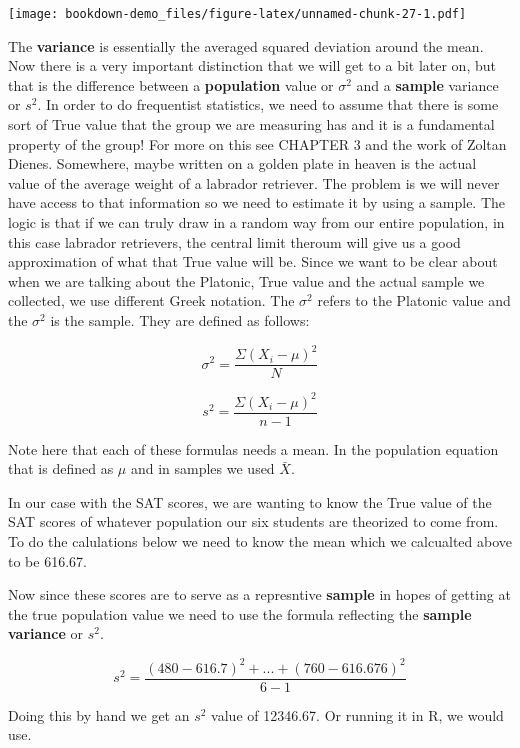 \documentclass[]{book}
\newenvironment{Shaded}{\begin{snugshade}}{\end{snugshade}}
\newcommand{\KeywordTok}[1]{\textcolor[rgb]{0.13,0.29,0.53}{\textbf{#1}}}
\newcommand{\OperatorTok}[1]{\textcolor[rgb]{0.81,0.36,0.00}{\textbf{#1}}}
\newcommand{\NormalTok}[1]{#1}
\theoremstyle{definition}
\theoremstyle{definition}
\theoremstyle{definition}
\theoremstyle{remark}
\begin{document}
\texttt{[image: bookdown-demo\_files/figure-latex/unnamed-chunk-27-1.pdf]}

The \textbf{variance} is essentially the averaged squared deviation
around the mean. Now there is a very important distinction that we will
get to a bit later on, but that is the difference between a
\textbf{population} value or \(\sigma^2\) and a \textbf{sample} variance
or \(s^2\). In order to do frequentist statistics, we need to assume
that there is some sort of True value that the group we are measuring
has and it is a fundamental property of the group! For more on this see
CHAPTER 3 and the work of Zoltan Dienes. Somewhere, maybe written on a
golden plate in heaven is the actual value of the average weight of a
labrador retriever. The problem is we will never have access to that
information so we need to estimate it by using a sample. The logic is
that if we can truly draw in a random way from our entire population, in
this case labrador retrievers, the central limit theroum will give us a
good approximation of what that True value will be. Since we want to be
clear about when we are talking about the Platonic, True value and the
actual sample we collected, we use different Greek notation. The
\(\sigma^2\) refers to the Platonic value and the \(\sigma^2\) is the
sample. They are defined as follows:

\[\sigma^2 = \frac{\Sigma(X_i - \mu)^2}{N}\]

\[s^2 = \frac{\Sigma(X_i - \mu)^2}{n-1}\]

Note here that each of these formulas needs a mean. In the population
equation that is defined as \(\mu\) and in samples we used \(\bar{X}\).

In our case with the SAT scores, we are wanting to know the True value
of the SAT scores of whatever population our six students are theorized
to come from. To do the calulations below we need to know the mean which
we calcualted above to be 616.67.

Now since these scores are to serve as a represntive \textbf{sample} in
hopes of getting at the true population value we need to use the formula
reflecting the \textbf{sample variance} or \(s^2\).

\[s^2 = \frac{(480-616.7)^2 + . . . + (760 - 616.676)^2}{6-1}\]

Doing this by hand we get an \(s^2\) value of 12346.67. Or running it in
R, we would use.

\begin{Shaded}
\end{Shaded}
\end{document}
